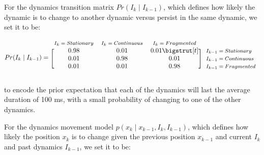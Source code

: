 \documentclass[times, twoside]{zHenriquesLab-StyleBioRxiv}
\begin{document}
For the dynamics transition matrix $Pr(I_{k} \mid I_{k-1})$, which defines how likely the dynamic is to change to another dynamic versus persist in the same dynamic, we set it to be:

\begin{equation*}
  Pr(I_{k} \mid I_{k-1}) = 
  \begin{blockarray}{*{3}{c} l}
    \begin{block}{*{3}{>{$\footnotesize}c<{$}} l}
      $I_{k} = Stationary$ & $I_{k} = Continuous$ & $I_{k} = Fragmented$ \\
    \end{block}
    \begin{block}{[*{3}{c}]>{$\footnotesize}l<{$}}
      0.98 & 0.01 & 0.01 \bigstrut[t]& $I_{k-1} = Stationary$ \\
      0.01 & 0.98 & 0.01 & $I_{k-1} = Continuous$ \\
      0.01 & 0.01 & 0.98 & $I_{k-1} = Fragmented$ \\
    \end{block}
  \end{blockarray}
\end{equation*}

to encode the prior expectation that each of the dynamics will last the average duration of 100 ms, with a small probability of changing to one of the other dynamics.

For the dynamics movement model $p(x_{k} \mid x_{k-1}, I_{k}, I_{k-1})$, which defines how likely the position $x_{k}$ is to change given the previous position $x_{k-1}$ and current $I_{k}$ and past dynamics $I_{k-1}$, we set it to be:
\end{document}
